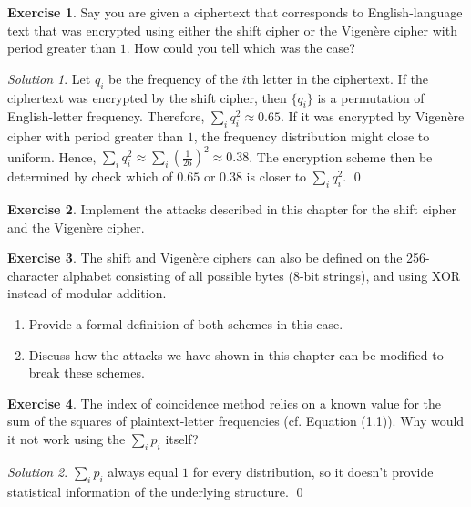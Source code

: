 \documentclass[titlepage,reqno]{amsart}
\theoremstyle{definition}
\newtheorem{exercise}{Exercise}[section]
\theoremstyle{remark}
\newtheorem*{solution}{Solution}
\begin{document}
\begin{exercise}
    Say you are given a ciphertext that corresponds to English-language text that was encrypted using either 
    the shift cipher or the Vigen\`ere cipher with period greater than $1$. How could you tell which was the case?
    
    \begin{solution}
        Let $q_i$ be the frequency of the $i$th letter in the ciphertext.
        If the ciphertext was encrypted by the shift cipher, then $\{q_i\}$ is a permutation of 
        English-letter frequency.
        Therefore, $\sum_{i} q_i^2 \approx 0.65$.
        If it was encrypted by Vigen\`ere cipher with period greater than $1$,  
        the frequency distribution might close to uniform.
        Hence, $\sum_{i} q_i^2 \approx \sum_{i}(\frac{1}{26})^2 \approx 0.38$.
        The encryption scheme then be determined by check which of $0.65$ or $0.38$ is closer to $\sum_i q_i^2$.
        \qed
    \end{solution}
\end{exercise}

\begin{exercise}
    Implement the attacks described in this chapter for the shift cipher and the Vigen\`ere cipher.
\end{exercise}

\begin{exercise}
    The shift and Vigen\`ere ciphers can also be defined on the 256-character alphabet consisting 
    of all possible bytes (8-bit strings), and using XOR instead of modular addition.
    \begin{enumerate}[label=(\alph*)]
        \item Provide a formal definition of both schemes in this case.
        \item Discuss how the attacks we have shown in this chapter can be modified to break these schemes.
    \end{enumerate}
\end{exercise}

\begin{exercise}
    The index of coincidence method relies on a known value for the sum of the squares of plaintext-letter frequencies 
    (cf. Equation (1.1)). Why would it not work using the $\sum_i p_i$ itself?

    \begin{solution}
        $\sum_i p_i$ always equal $1$ for every distribution, so it doesn't provide statistical information
        of the underlying structure.
        \qed
    \end{solution}
\end{exercise}
\end{document}
